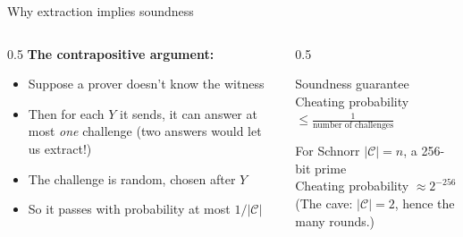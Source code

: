 \ifdefined\PRESENTATION\else\PassOptionsToClass{handout}{beamer}\fi\documentclass[aspectratio=169, lualatex]{beamer}
\begin{document}
\begin{frame}{Why extraction implies soundness}
	\begin{columns}[c]
		\begin{column}{0.5\textwidth}
			\textbf{The contrapositive argument:}
			\begin{itemize}
				\item Suppose a prover doesn't know the witness
				\item Then for each $Y$ it sends, it can answer at most \textit{one} challenge (two answers would let us extract!)
				\item The challenge is random, chosen after $Y$
				\item So it passes with probability at most $1 / |\mathcal{C}|$
			\end{itemize}
		\end{column}
		\begin{column}{0.5\textwidth}
			\begin{alertblock}{Soundness guarantee}
				Cheating probability $\leq \frac{1}{\text{number of challenges}}$
			\end{alertblock}
			\begin{exampleblock}{For Schnorr}
				$|\mathcal{C}| = n$, a 256-bit prime\\
				Cheating probability $\approx 2^{-256}$\\
				(The cave: $|\mathcal{C}| = 2$, hence the many rounds.)
			\end{exampleblock}
		\end{column}
	\end{columns}
\end{frame}
\end{document}
